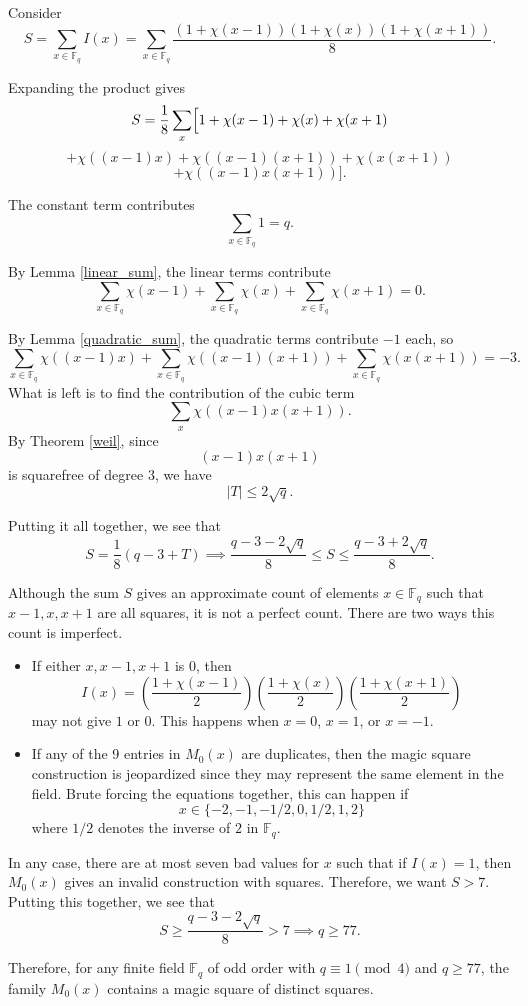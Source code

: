 \documentclass{article}
\newcommand{\p}[1]{\left( #1 \right)}
\newcommand{\F}{\mathbb F}
\theoremstyle{definition}
\numberwithin{equation}{section}
\begin{document}
Consider
\[
S=
\sum_{x\in\F_q}
I(x)
=
\sum_{x\in\F_q}
\frac{(1+\chi(x-1))(1+\chi(x))(1+\chi(x+1))}{8}.
\]

Expanding the product gives
\[
S
=
\frac18
\sum_x
\Bigl[
1
+\chi(x-1)
+\chi(x)
+\chi(x+1)
\]
\[
+\chi((x-1)x)
+\chi((x-1)(x+1))
+\chi(x(x+1))
\]
\[
+\chi((x-1)x(x+1))
\Bigr].
\]

The constant term contributes
\[
\sum_{x \in \F_q} 1=q.
\]

By Lemma \ref{linear_sum}, the linear terms contribute
\[
\sum_{x \in \F_q}\chi(x-1)+\sum_{x \in \F_q}\chi(x)+\sum_{x \in \F_q}\chi(x+1)=0.
\]

By Lemma \ref{quadratic_sum}, the quadratic terms contribute $-1$ each, so
\[
\sum_{x \in \F_q}\chi((x-1)x)+\sum_{x \in \F_q}\chi((x-1)(x+1))+\sum_{x \in \F_q}\chi(x(x+1))=-3.
\]
What is left is to find the contribution of the cubic term
$$\sum_x\chi((x-1)x(x+1)).$$ By Theorem \ref{weil}, since
\[
(x-1)x(x+1)
\]
is squarefree of degree \(3\), we have
\[
|T|\le 2\sqrt q.
\]

Putting it all together, we see that $$S = \frac{1}{8} \p{q-3+T} \implies \frac{q-3-2\sqrt{q}}{8} \leq S \leq \frac{q-3+2\sqrt{q}}{8}.$$

Although the sum \(S\) gives an approximate count of elements \(x\in\F_q\) such that \(x-1,x,x+1\) are all squares, it is not a perfect count. There are two ways this count is imperfect.
\begin{itemize}
    \item If either $x, x-1, x+1$ is 0, then $$I(x) = \p{\frac{1+\chi(x-1)}{2}}\p{\frac{1+\chi(x)}{2}}\p{\frac{1+\chi(x+1)}{2}}$$ may not give \(1\) or \(0\). This happens when \(x=0\), \(x=1\), or \(x=-1\).
    \item If any of the 9 entries in $M_0(x)$ are duplicates, then the magic square construction is jeopardized since they may represent the same element in the field. Brute forcing the equations together, this can happen if $$x \in \{-2, -1, -1/2, 0, 1/2, 1, 2\}$$
    where \(1/2\) denotes the inverse of \(2\) in \(\F_q\).
\end{itemize}

In any case, there are at most seven bad values for $x$ such that if $I(x)=1$, then $M_0(x)$ gives an invalid construction with squares. Therefore, we want $S>7$. Putting this together, we see that
$$S \geq \frac{q-3-2\sqrt{q}}{8} > 7 \implies q \geq 77.$$

Therefore, for any finite field \(\F_q\) of odd order with \(q\equiv1\pmod4\) and \(q\geq77\), the family \(M_0(x)\) contains a magic square of distinct squares.
\end{document}
